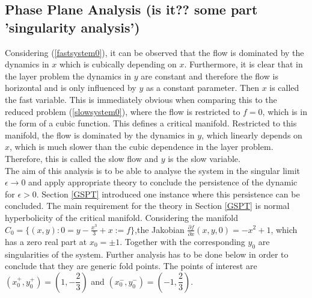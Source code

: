 \subsection{Phase Plane Analysis (is it?? some part 'singularity analysis')}
\begin{figure}[h]\centering
\end{figure}
Considering (\ref{fastsystem0}), it can be observed that the flow is dominated by the dynamics in $x$ which is cubically depending on $x$.
Furthermore, it is clear that in the layer problem the dynamics in $y$ are constant and therefore the flow is horizontal and is only influenced by $y$ as a constant parameter. Then $x$ is called the fast variable.
This is immediately obvious when comparing this to the reduced problem (\ref{slowsystem0}), where the flow is restricted to $f=0$, which is in the form of a cubic function. This defines a critical manifold. Restricted to this manifold, the flow is dominated by the dynamics in $y$, which linearly depends on $x$, which is much slower than the cubic dependence in the layer problem. Therefore, this is called the slow flow and $y$ is the slow variable. \\


The aim of this analysis is to be able to analyse the system in the singular limit $\epsilon \to 0$ and apply appropriate theory to conclude the persistence of the dynamic for $\epsilon > 0$. 
Section \ref{GSPT} introduced one instance where this persistence can be concluded.
The main requirement for the theory in Section \ref{GSPT} is normal hyperbolicity of the critical manifold.
Considering the manifold $C_0= \{ (x,y) : 0=y-\frac{x^3}{3}+x:=f \}$,the Jakobian $\frac{ \partial f}{\partial x}(x,y,0) = -x^2 + 1$, which has a zero real part at $x_0= \pm 1$. Together with the corresponding $y_0$ are singularities of the system.
Further analysis has to be done below in order to conclude that they are generic fold points.
The points of interest are $(x_0^+,y_0^+)=(1,-\dfrac{2}{3})$ and $(x_0^-,y_0^-)=(-1,\dfrac{2}{3})$.

